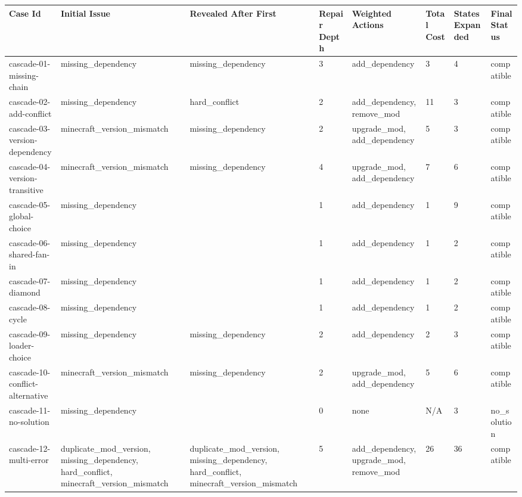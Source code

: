 \begin{tabularx}{\linewidth}{@{}lXXXXXXX@{}}
\hline
Case Id & Initial Issue & Revealed After First & Repair Depth & Weighted Actions & Total Cost & States Expanded & Final Status \\
\hline
cascade-01-missing-chain & missing\_dependency & missing\_dependency & 3 & add\_dependency & 3 & 4 & compatible \\
cascade-02-add-conflict & missing\_dependency & hard\_conflict & 2 & add\_dependency, remove\_mod & 11 & 3 & compatible \\
cascade-03-version-dependency & minecraft\_version\_mismatch & missing\_dependency & 2 & upgrade\_mod, add\_dependency & 5 & 3 & compatible \\
cascade-04-version-transitive & minecraft\_version\_mismatch & missing\_dependency & 4 & upgrade\_mod, add\_dependency & 7 & 6 & compatible \\
cascade-05-global-choice & missing\_dependency &  & 1 & add\_dependency & 1 & 9 & compatible \\
cascade-06-shared-fan-in & missing\_dependency &  & 1 & add\_dependency & 1 & 2 & compatible \\
cascade-07-diamond & missing\_dependency &  & 1 & add\_dependency & 1 & 2 & compatible \\
cascade-08-cycle & missing\_dependency &  & 1 & add\_dependency & 1 & 2 & compatible \\
cascade-09-loader-choice & missing\_dependency & missing\_dependency & 2 & add\_dependency & 2 & 3 & compatible \\
cascade-10-conflict-alternative & minecraft\_version\_mismatch & missing\_dependency & 2 & upgrade\_mod, add\_dependency & 5 & 6 & compatible \\
cascade-11-no-solution & missing\_dependency &  & 0 & none & N/A & 3 & no\_solution \\
cascade-12-multi-error & duplicate\_mod\_version, missing\_dependency, hard\_conflict, minecraft\_version\_mismatch & duplicate\_mod\_version, missing\_dependency, hard\_conflict, minecraft\_version\_mismatch & 5 & add\_dependency, upgrade\_mod, remove\_mod & 26 & 36 & compatible \\
\hline
\end{tabularx}
